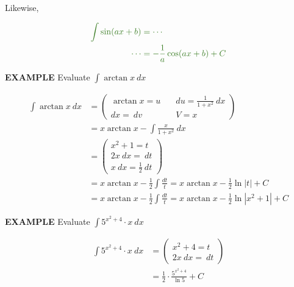\documentclass{article}
\begin{document}
\vspace{10pt}

Likewise,

\begin{align*}
\color{OliveGreen}\int\sin(ax+b)&\color{OliveGreen}=\cdots\\
\color{OliveGreen}\cdots&\color{OliveGreen}=-\frac{1}{a}\cos(ax+b)+C
\end{align*}

\newpage

{\bf{}EXAMPLE} Evaluate $\displaystyle\int\arctan x\ dx$

\begin{align*}
\int\arctan x\ dx&=\left(\begin{aligned}\arctan x=u&\quad du=\frac{1}{1+x^2}\ dx\\dx=\ dv&\quad V=x\end{aligned}\right)\\
&=x\arctan x-\int\frac{x}{1+x^2}\ dx\\
&=\left(\begin{aligned}x^2+1=t\\2x\ dx=\ dt\\x\ dx=\frac{1}{2}\ dt\end{aligned}\right)\\
&=x\arctan x-\frac{1}{2}\int\frac{dt}{t}=x\arctan x-\frac{1}{2}\ln|t|+C\\
&=x\arctan x-\frac{1}{2}\int\frac{dt}{t}=x\arctan x-\frac{1}{2}\ln|x^2+1|+C
\end{align*}

\vspace{10pt}

{\bf{}EXAMPLE} Evaluate $\displaystyle\int5^{x^2+4}\cdot x\ dx$

\begin{align*}
\int5^{x^2+4}\cdot x\ dx&=\left(\begin{aligned}x^2+4=t\\2x\ dx=\ dt\end{aligned}\right)\\
&=\frac{1}{2}\cdot\frac{5^{x^2+4}}{\ln5}+C
\end{align*}
\end{document}
